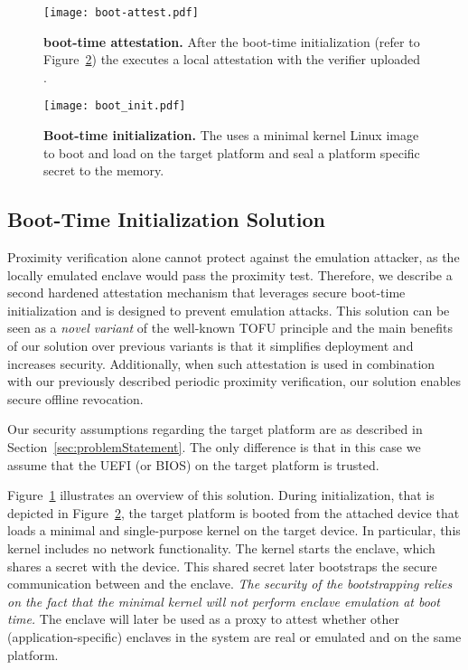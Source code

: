 \begin{figure}[t]
 \centering
\texttt{[image: boot-attest.pdf]}
 \caption{\textbf{\name boot-time attestation.} After the boot-time initialization (refer to Figure~\ref{fig:boot-init}) the \nameclave executes a local attestation with the verifier uploaded \app. 
 }
\figsaver
 \label{fig:boot-attest}
\end{figure}


\begin{figure}[t]
 \centering
    \texttt{[image: boot\_init.pdf]}
 \caption{\textbf{Boot-time initialization.} The \device uses a minimal kernel Linux image to boot and load \nameclave on the target platform and seal a platform specific secret to the \device memory.}
\vspace{-5pt}
 \label{fig:boot-init}
\end{figure}



\subsection{Boot-Time Initialization Solution}

Proximity verification alone cannot protect against the emulation attacker, as the locally emulated enclave would pass the proximity test. 
%
Therefore, we describe a second hardened attestation mechanism that leverages secure boot-time initialization and is designed to prevent emulation attacks. This solution can be seen as a \emph{novel variant} of the well-known TOFU principle and the main benefits of our solution over previous variants is that it simplifies deployment and increases security. Additionally, when such attestation is used in combination with our previously described periodic proximity verification, our solution enables secure offline revocation.


Our security assumptions regarding the target platform are as described in Section~\ref{sec:problemStatement}. The only difference is that in this case we assume that the UEFI (or BIOS) on the target platform is trusted.


Figure~\ref{fig:boot-attest} illustrates an overview of this solution. During initialization, that is depicted in Figure~\ref{fig:boot-init}, the target platform is booted from the attached device that loads a minimal and single-purpose \name kernel on the target device. In particular, this kernel includes no network functionality. The kernel starts the \name enclave, which shares a secret with the device. This shared secret later bootstraps the secure communication between \device and the \name enclave. \emph{The security of the bootstrapping relies on the fact that the minimal kernel will not perform enclave emulation at boot time.} The \name enclave will later be used as a proxy to attest whether other (application-specific) enclaves in the system are real or emulated and on the same platform.


